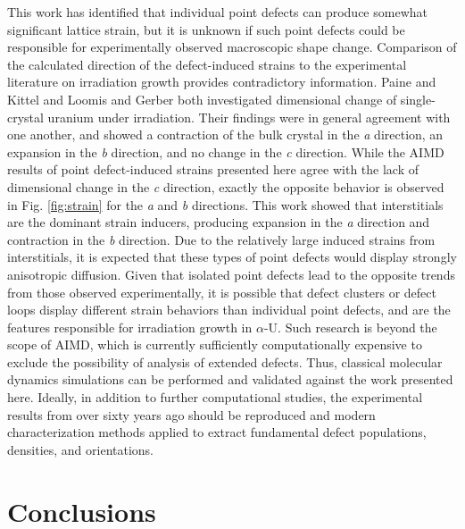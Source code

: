 \documentclass[utf8]{frontiersSCNS} %
\begin{document}
This work has identified that individual point defects can produce somewhat significant lattice strain, but it is unknown if such point defects could be responsible for experimentally observed macroscopic shape change. Comparison of the calculated direction of the defect-induced strains to the experimental literature on irradiation growth provides contradictory information. Paine and Kittel \cite{paine1958} and Loomis and Gerber \cite{loomis1968} both investigated dimensional change of single-crystal uranium under irradiation. Their findings were in general agreement with one another, and showed a contraction of the bulk crystal in the \textit{a} direction, an expansion in the \textit{b} direction, and no change in the \textit{c} direction. While the AIMD results of point defect-induced strains presented here agree with the lack of dimensional change in the \textit{c} direction, exactly the opposite behavior is observed in Fig. \ref{fig:strain} for the \textit{a} and \textit{b} directions. This work showed that interstitials are the dominant strain inducers, producing expansion in the \textit{a} direction and contraction in the \textit{b} direction. Due to the relatively large induced strains from interstitials, it is expected that these types of point defects would display strongly anisotropic diffusion. Given that isolated point defects lead to the opposite trends from those observed experimentally, it is possible that defect clusters or defect loops display different strain behaviors than individual point defects, and are the features responsible for irradiation growth in $\alpha$-U. Such research is beyond the scope of AIMD, which is currently sufficiently computationally expensive to exclude the possibility of analysis of extended defects. Thus, classical molecular dynamics simulations can be performed and validated against the work presented here. Ideally, in addition to further computational studies, the experimental results from over sixty years ago should be reproduced and modern characterization methods applied to extract fundamental defect populations, densities, and orientations. 

\FloatBarrier

\section{Conclusions}
\end{document}
